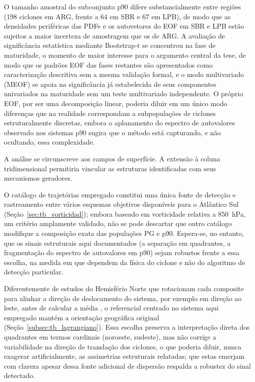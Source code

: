 O tamanho amostral do subconjunto p90 difere substancialmente entre regiões (198 ciclones em ARG, frente a 64 em SBR e 67 em LPB), de modo que as densidades periféricas das PDFe e os autovetores do EOF em SBR e LPB estão sujeitos a maior incerteza de amostragem que os de ARG. A avaliação de significância estatística mediante Bootstrap-t se concentrou na fase de maturidade, o momento de maior interesse para o argumento central da tese, de modo que os padrões EOF das fases restantes são apresentados como caracterização descritiva sem a mesma validação formal, e o modo multivariado (MEOF) se apoia na significância já estabelecida de seus componentes univariados na maturidade sem um teste multivariado independente. O próprio EOF, por ser uma decomposição linear, poderia diluir em um único modo diferenças que na realidade correspondam a subpopulações de ciclones estruturalmente discretas, embora o aplanamento do espectro de autovalores observado nos sistemas p90 sugira que o método está capturando, e não ocultando, essa complexidade.

A análise se circunscreve aos campos de superfície. A extensão à coluna tridimensional permitiria vincular as estruturas identificadas com seus mecanismos geradores.

O catálogo de trajetórias empregado \citep{gramcianinov2020analysis} constitui uma única fonte de detecção e rastreamento entre vários esquemas objetivos disponíveis para o Atlântico Sul (Seção~\ref{sec:tb_vorticidad}); embora baseado em vorticidade relativa a 850~hPa, um critério amplamente validado, não se pode descartar que outro catálogo modifique a composição exata das populações PG e p90. Espera-se, no entanto, que os sinais estruturais aqui documentados (a separação em quadrantes, a fragmentação do espectro de autovalores em p90) sejam robustos frente a essa escolha, na medida em que dependem da física do ciclone e não do algoritmo de detecção particular.

Diferentemente de estudos do Hemisfério Norte que rotacionam cada composite para alinhar a direção de deslocamento do sistema, por exemplo em direção ao leste, antes de calcular a média \citep{rudeva2011composite, priestley2022improved}, o referencial centrado no sistema aqui empregado mantém a orientação geográfica original (Seção~\ref{subsec:tb_lagrangiano}). Essa escolha preserva a interpretação direta dos quadrantes em termos cardinais (noroeste, sudeste), mas não corrige a variabilidade na direção de translação dos ciclones, o que poderia diluir, nunca exagerar artificialmente, as assimetrias estruturais relatadas; que estas emerjam com clareza apesar dessa fonte adicional de dispersão respalda a robustez do sinal detectado.

